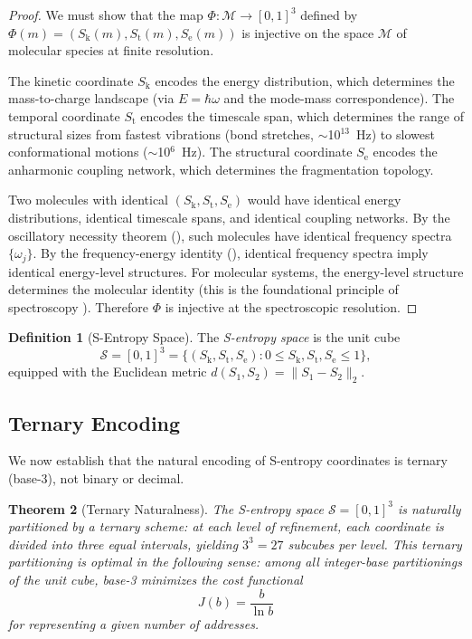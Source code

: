 \documentclass[11pt,twocolumn,a4paper]{article}
\newtheorem{theorem}{Theorem}[section]
\theoremstyle{definition}
\newtheorem{definition}[theorem]{Definition}
\theoremstyle{remark}
\newcommand{\Sk}{S_{\mathrm{k}}}
\newcommand{\St}{S_{\mathrm{t}}}
\newcommand{\Se}{S_{\mathrm{e}}}
\newcommand{\Sspace}{\mathcal{S}}
\begin{document}
\begin{proof}
We must show that the map $\Phi\colon \mathcal{M} \to [0,1]^3$ defined by $\Phi(m) = (\Sk(m), \St(m), \Se(m))$ is injective on the space $\mathcal{M}$ of molecular species at finite resolution.

The kinetic coordinate $\Sk$ encodes the energy distribution, which determines the mass-to-charge landscape (via $E = \hbar \omega$ and the mode-mass correspondence). The temporal coordinate $\St$ encodes the timescale span, which determines the range of structural sizes from fastest vibrations (bond stretches, $\sim$10$^{13}$~Hz) to slowest conformational motions ($\sim$10$^{6}$~Hz). The structural coordinate $\Se$ encodes the anharmonic coupling network, which determines the fragmentation topology.

Two molecules with identical $(\Sk, \St, \Se)$ would have identical energy distributions, identical timescale spans, and identical coupling networks. By the oscillatory necessity theorem (), such molecules have identical frequency spectra $\{\omega_j\}$. By the frequency-energy identity (), identical frequency spectra imply identical energy-level structures. For molecular systems, the energy-level structure determines the molecular identity (this is the foundational principle of spectroscopy \citep{herzberg1945,shimanouchi1972}). Therefore $\Phi$ is injective at the spectroscopic resolution.
\end{proof}

\begin{definition}[S-Entropy Space]\label{def:s-space}
The \emph{S-entropy space} is the unit cube
\begin{equation}\label{eq:s-space}
  \Sspace = [0, 1]^3 = \{(\Sk, \St, \Se) : 0 \leq \Sk, \St, \Se \leq 1\},
\end{equation}
equipped with the Euclidean metric $d(S_1, S_2) = \| S_1 - S_2 \|_2$.
\end{definition}

\subsection{Ternary Encoding}\label{sec:ternary-encoding}

We now establish that the natural encoding of S-entropy coordinates is ternary (base-3), not binary or decimal.

\begin{theorem}[Ternary Naturalness]\label{thm:ternary}
The S-entropy space $\Sspace = [0,1]^3$ is naturally partitioned by a ternary scheme: at each level of refinement, each coordinate is divided into three equal intervals, yielding $3^3 = 27$ subcubes per level. This ternary partitioning is optimal in the following sense: among all integer-base partitionings of the unit cube, base-3 minimizes the cost functional
\begin{equation}\label{eq:ternary-optimal}
  J(b) = \frac{b}{\ln b}
\end{equation}
for representing a given number of addresses.
\end{theorem}
\end{document}
